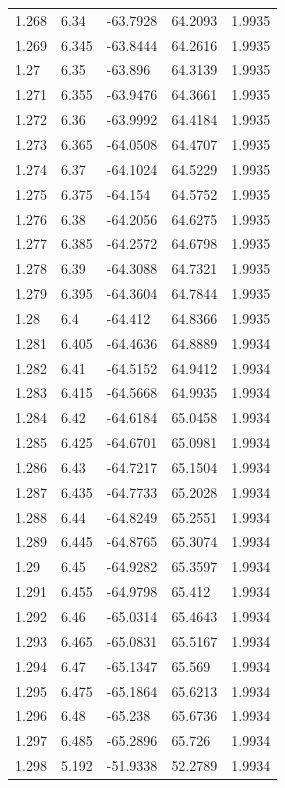 \begin{tabular}{lllll}
1.268 & 6.34 & -63.7928 & 64.2093 & 1.9935 \\
1.269 & 6.345 & -63.8444 & 64.2616 & 1.9935 \\
1.27 & 6.35 & -63.896 & 64.3139 & 1.9935 \\
1.271 & 6.355 & -63.9476 & 64.3661 & 1.9935 \\
1.272 & 6.36 & -63.9992 & 64.4184 & 1.9935 \\
1.273 & 6.365 & -64.0508 & 64.4707 & 1.9935 \\
1.274 & 6.37 & -64.1024 & 64.5229 & 1.9935 \\
1.275 & 6.375 & -64.154 & 64.5752 & 1.9935 \\
1.276 & 6.38 & -64.2056 & 64.6275 & 1.9935 \\
1.277 & 6.385 & -64.2572 & 64.6798 & 1.9935 \\
1.278 & 6.39 & -64.3088 & 64.7321 & 1.9935 \\
1.279 & 6.395 & -64.3604 & 64.7844 & 1.9935 \\
1.28 & 6.4 & -64.412 & 64.8366 & 1.9935 \\
1.281 & 6.405 & -64.4636 & 64.8889 & 1.9934 \\
1.282 & 6.41 & -64.5152 & 64.9412 & 1.9934 \\
1.283 & 6.415 & -64.5668 & 64.9935 & 1.9934 \\
1.284 & 6.42 & -64.6184 & 65.0458 & 1.9934 \\
1.285 & 6.425 & -64.6701 & 65.0981 & 1.9934 \\
1.286 & 6.43 & -64.7217 & 65.1504 & 1.9934 \\
1.287 & 6.435 & -64.7733 & 65.2028 & 1.9934 \\
1.288 & 6.44 & -64.8249 & 65.2551 & 1.9934 \\
1.289 & 6.445 & -64.8765 & 65.3074 & 1.9934 \\
1.29 & 6.45 & -64.9282 & 65.3597 & 1.9934 \\
1.291 & 6.455 & -64.9798 & 65.412 & 1.9934 \\
1.292 & 6.46 & -65.0314 & 65.4643 & 1.9934 \\
1.293 & 6.465 & -65.0831 & 65.5167 & 1.9934 \\
1.294 & 6.47 & -65.1347 & 65.569 & 1.9934 \\
1.295 & 6.475 & -65.1864 & 65.6213 & 1.9934 \\
1.296 & 6.48 & -65.238 & 65.6736 & 1.9934 \\
1.297 & 6.485 & -65.2896 & 65.726 & 1.9934 \\
1.298 & 5.192 & -51.9338 & 52.2789 & 1.9934 \\

\end{tabular}
